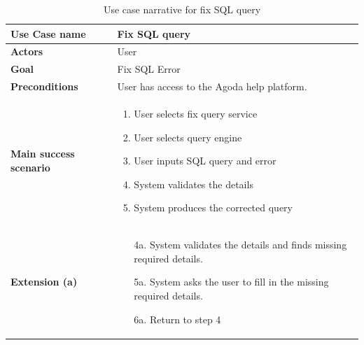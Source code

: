     \begin{table}[H] 
        \centering 
        \caption{Use case narrative for fix SQL query} 
        \label{tbl:use-case-fix-sql} 
        \begin{tabular}{|p{4cm}|p{10cm}|} 
        \hline 
        \textbf{Use Case name} & Fix SQL query \\ 
        \hline 
        \textbf{Actors} & User \\ 
        \hline 
        \textbf{Goal} & Fix SQL Error \\ 
        \hline 
        \textbf{Preconditions} & User has access to the Agoda help platform. \\ 
        \hline 
        \textbf{Main success scenario} & 
        \begin{enumerate} 
            \item User selects fix query service
            \item User selects query engine
            \item User inputs SQL query and error
            \item System validates the details
            \item System produces the corrected query 
        \end{enumerate} 
        \\ 
        \hline 
        \textbf{Extension (a)} & 
        \begin{enumerate} 
            \item[4a.] System validates the details and finds missing required details.
            \item[5a.] System asks the user to fill in the missing required details.
            \item[6a.] Return to step 4 
        \end{enumerate} 
        \\ 
        \hline 
        \end{tabular} 
    \end{table}

